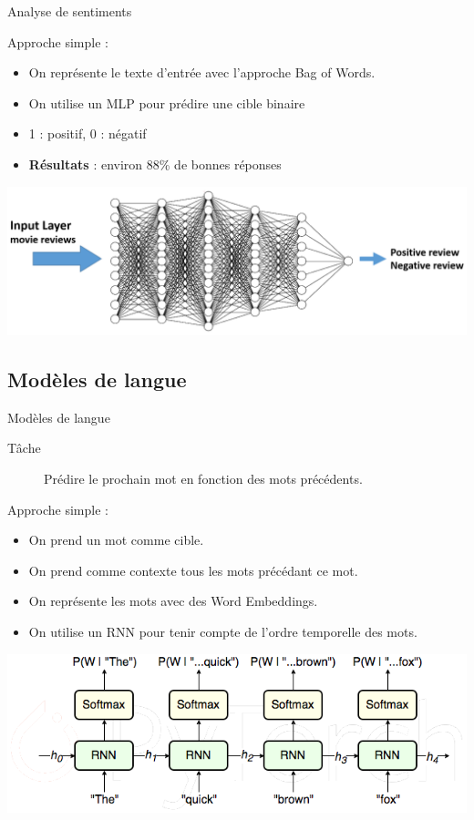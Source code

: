\documentclass[french]{beamer}
\begin{document}
\begin{frame}{Analyse de sentiments}

Approche simple : \\
\begin{itemize}
	\item On représente le texte d'entrée avec l'approche Bag of Words.
	\item On utilise un MLP pour prédire une cible binaire
	\item 1 : positif, 0 : négatif
	\item \textbf{Résultats} : environ 88\% de bonnes réponses
\end{itemize}

\centering
\includegraphics[width=\textwidth]{figures/sentiment_analysis_mlp.png}
\end{frame}


\subsection{Modèles de langue}

\begin{frame}{Modèles de langue}

\begin{description}
	\item [Tâche] Prédire le prochain mot en fonction des mots précédents.
\end{description}

Approche simple : \\
\begin{itemize}
	\item On prend un mot comme cible.
	\item On prend comme contexte tous les mots précédant ce mot.
	\item On représente les mots avec des Word Embeddings.
	\item On utilise un RNN pour tenir compte de l'ordre temporelle des mots.
\end{itemize}
\centering
\includegraphics[width=\textwidth]{figures/rnn_language_model.png}

\end{frame}
\end{document}
